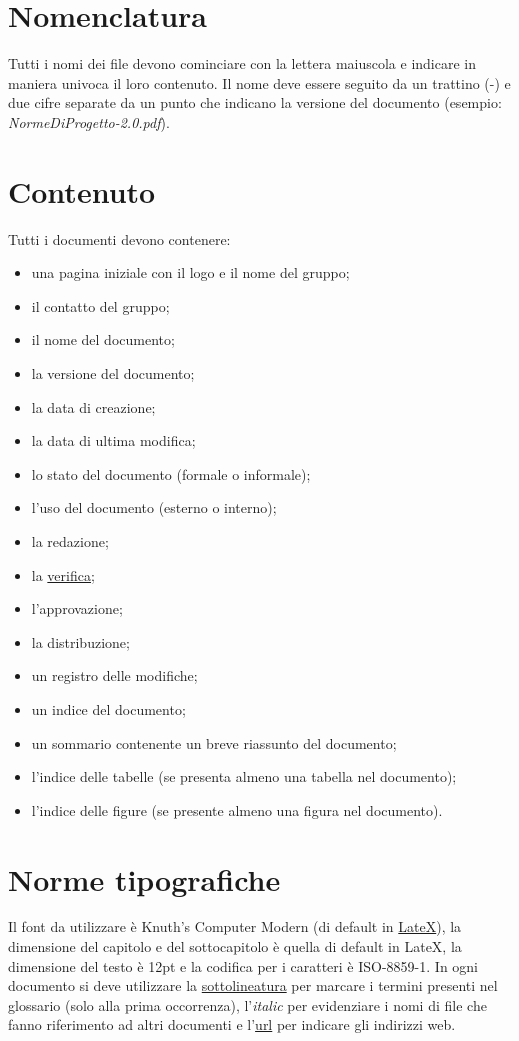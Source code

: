 \section{Nomenclatura}
Tutti i nomi dei file devono cominciare con la lettera maiuscola e
indicare in maniera univoca il loro contenuto. Il nome deve essere seguito da un
trattino (-) e due cifre separate da un punto che indicano la versione del
documento (esempio: \emph{NormeDiProgetto-2.0.pdf}).

\section{Contenuto}
Tutti i documenti devono contenere: 
\begin{itemize}
\item {una pagina iniziale con il logo e il nome del gruppo;}
\item {il contatto del gruppo;}
\item {il nome del documento;}
\item {la versione del documento;}
\item {la data di creazione;}
\item {la data di ultima modifica;}
\item {lo stato del documento (formale o informale);}
\item {l'uso del documento (esterno o interno);}
\item {la redazione;}
\item {la \underline{verifica};}
\item {l'approvazione;}
\item {la distribuzione;}
\item {un registro delle modifiche;}
\item {un indice del documento;}
\item {un sommario contenente un breve riassunto del documento;}
\item {l'indice delle tabelle (se presenta almeno una tabella nel documento);}
\item {l'indice delle figure (se presente almeno una figura nel documento).}
\end{itemize} 

\section{Norme tipografiche}
Il font da utilizzare \`e Knuth's Computer Modern (di default in
\underline{LateX}), la dimensione del capitolo e del sottocapitolo \`e quella di
default in LateX, la dimensione del testo \`e 12pt e la codifica per i caratteri
\`e ISO-8859-1. In ogni documento si deve utilizzare la \underline{sottolineatura} per marcare i termini presenti nel glossario (solo
alla prima occorrenza), l'\emph{italic} per evidenziare i nomi di file che
fanno riferimento ad altri documenti e l'\url{url} per indicare gli indirizzi
web.

